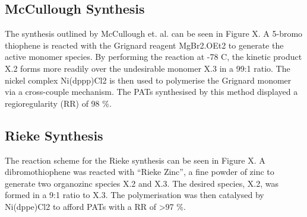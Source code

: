 \subsection{McCullough Synthesis}

The synthesis outlined by McCullough et. al. can be seen in Figure X. A 5-bromo thiophene is reacted with the Grignard reagent MgBr2.OEt2 to generate the active monomer species. By performing the reaction at -78 C, the kinetic product X.2 forms more readily over the undesirable monomer X.3 in a 99:1 ratio. The nickel complex Ni(dppp)Cl2 is then used to polymerise the Grignard monomer via a cross-couple mechanism. The PATs synthesised by this method displayed a regioregularity (RR) of 98 \%.

\subsection{Rieke Synthesis}

The reaction scheme for the Rieke synthesis can be seen in Figure X. A dibromothiophene was reacted with “Rieke Zinc”, a fine powder of zinc to generate two organozinc species X.2 and X.3. The desired species, X.2, was formed in a 9:1 ratio to X.3. The polymerisation was then catalysed by Ni(dppe)Cl2 to afford PATs with a RR of >97 \%.

